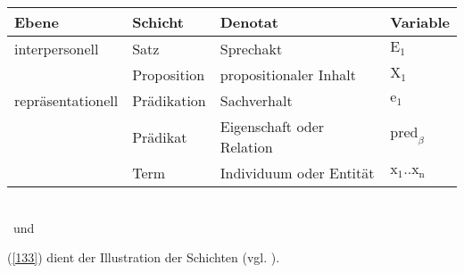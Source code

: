 \begin{exe}
	\ex\label{132}
     \begin{tabular}[t]{|l|l|l|l|}
     		\hline
     		Ebene & Schicht & Denotat & Variable\\
            \hline
            interpersonell & Satz & Sprechakt & $\textrm{E}_{\textrm{1}}$\\
             \hline
             & Proposition & propositionaler Inhalt & $\textrm{X}_{\textrm{1}}$\\
             \hline
             repräsentationell & Prädikation & Sachverhalt & $\textrm{e}_{\textrm{1}}$\\
             \hline
             & Prädikat & Eigenschaft oder Relation & $\textrm{pred}_{\beta}$\\
             \hline
             & Term & Individuum oder Entität & $\textrm{x}_{\textrm{1}}..\textrm{x}_{\textrm{n}}$\\
       		 \hline
      \end{tabular}\\
      \hbox{}\hfill\hbox{\citet[46]{Dik1989} und \citet[130]{Hengeveld1989}}
\end{exe}
(\ref{133}) dient der Illustration der Schichten (vgl. \citealt[4]{Hengeveld1990}).


